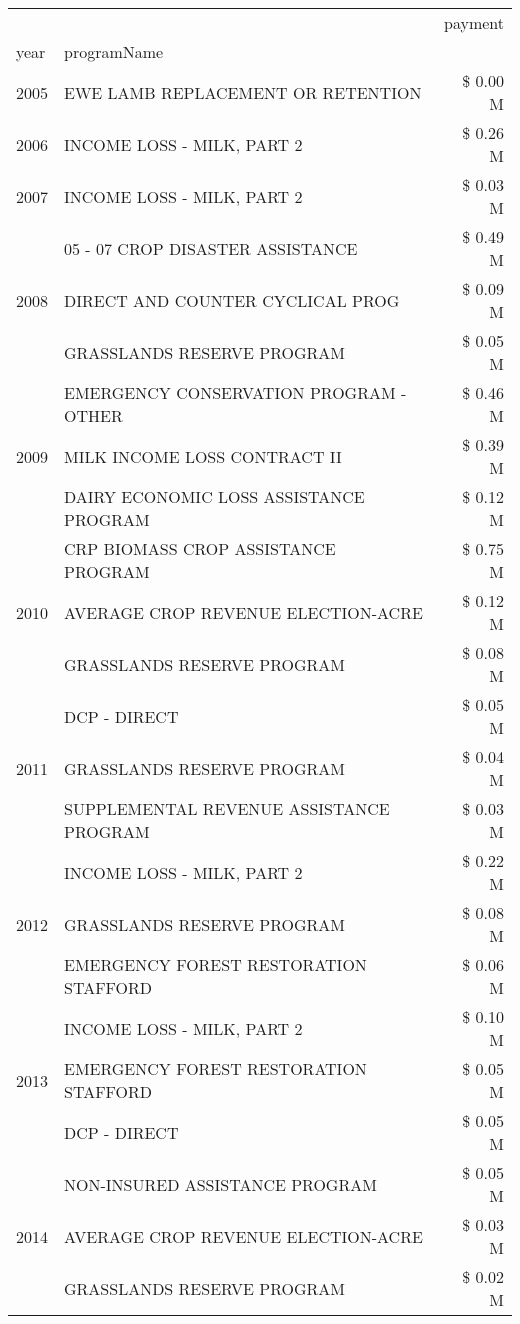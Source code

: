 \begin{tabular}{llr}
\toprule
 &  & payment \\
year & programName &  \\
\midrule
2005 & EWE LAMB REPLACEMENT OR RETENTION & \$ 0.00 M \\
\cline{1-3}
2006 & INCOME LOSS - MILK, PART 2 & \$ 0.26 M \\
\cline{1-3}
2007 & INCOME LOSS - MILK, PART 2 & \$ 0.03 M \\
\cline{1-3}
\multirow[t]{3}{*}{2008} & 05 - 07 CROP DISASTER ASSISTANCE & \$ 0.49 M \\
 & DIRECT AND COUNTER CYCLICAL PROG & \$ 0.09 M \\
 & GRASSLANDS RESERVE PROGRAM & \$ 0.05 M \\
\cline{1-3}
\multirow[t]{3}{*}{2009} & EMERGENCY CONSERVATION PROGRAM - OTHER & \$ 0.46 M \\
 & MILK INCOME LOSS CONTRACT II & \$ 0.39 M \\
 & DAIRY ECONOMIC LOSS ASSISTANCE PROGRAM & \$ 0.12 M \\
\cline{1-3}
\multirow[t]{3}{*}{2010} & CRP BIOMASS CROP ASSISTANCE PROGRAM & \$ 0.75 M \\
 & AVERAGE CROP REVENUE ELECTION-ACRE & \$ 0.12 M \\
 & GRASSLANDS RESERVE PROGRAM & \$ 0.08 M \\
\cline{1-3}
\multirow[t]{3}{*}{2011} & DCP - DIRECT & \$ 0.05 M \\
 & GRASSLANDS RESERVE PROGRAM & \$ 0.04 M \\
 & SUPPLEMENTAL REVENUE ASSISTANCE PROGRAM & \$ 0.03 M \\
\cline{1-3}
\multirow[t]{3}{*}{2012} & INCOME LOSS - MILK, PART 2 & \$ 0.22 M \\
 & GRASSLANDS RESERVE PROGRAM & \$ 0.08 M \\
 & EMERGENCY FOREST RESTORATION STAFFORD & \$ 0.06 M \\
\cline{1-3}
\multirow[t]{3}{*}{2013} & INCOME LOSS - MILK, PART 2 & \$ 0.10 M \\
 & EMERGENCY FOREST RESTORATION STAFFORD & \$ 0.05 M \\
 & DCP - DIRECT & \$ 0.05 M \\
\cline{1-3}
\multirow[t]{3}{*}{2014} & NON-INSURED ASSISTANCE PROGRAM & \$ 0.05 M \\
 & AVERAGE CROP REVENUE ELECTION-ACRE & \$ 0.03 M \\
 & GRASSLANDS RESERVE PROGRAM & \$ 0.02 M \\

\end{tabular}
